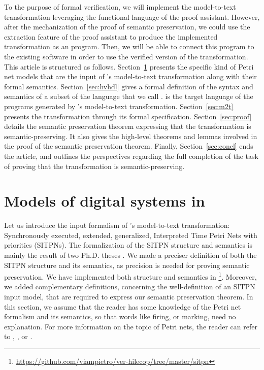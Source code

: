 \documentclass[pdflatex,sn-mathphys]{sn-jnl}%
\theoremstyle{thmstyleone}%
\theoremstyle{thmstyletwo}%
\theoremstyle{thmstylethree}%
\begin{document}
To the purpose of formal verification, we will implement the
\hilecop{} model-to-text transformation leveraging the functional
language of the \coq{} proof assistant. However, after the
mechanization of the proof of semantic preservation, we could use the
extraction feature of the \coq{} proof assistant to produce the
implemented transformation as an \ocaml{} program. Then, we will be
able to connect this program to the existing \hilecop{} software in
order
to use the verified version of the transformation.\\

This article is structured as
follows. Section~\ref{sec:hilecop-models} presents the specific kind
of Petri net models that are the input of \hilecop{}'s model-to-text
transformation along with their formal semantics.
Section~\ref{sec:hvhdl} gives a formal definition of the syntax and
semantics of a subset of the \vhdl{} language that we call
\hvhdl{}. \hvhdl{} is the target language of the programs generated by
\hilecop{}'s model-to-text transformation.  Section~\ref{sec:m2t}
presents the transformation through its formal specification.
Section~\ref{sec:proof} details the semantic preservation theorem
expressing that the \hilecop{} transformation is semantic-preserving.
It also gives the high-level theorems and lemmas involved in the proof
of the semantic preservation theorem.  Finally,
Section~\ref{sec:concl} ends the article, and outlines the
perspectives regarding the full completion of the task of proving that
the \hilecop{} transformation is semantic-preserving.

\section{Models of digital systems in \hilecop{}}
\label{sec:hilecop-models}

Let us introduce the input formalism of \hilecop{}'s model-to-text
transformation: Synchronously executed, extended, generalized,
Interpreted Time Petri Nets with priorities (SITPNs). The
formalization of the SITPN structure and semantics is mainly the
result of two Ph.D. theses \cite{Leroux2014,Merzoug2018}. We made a
preciser definition of both the SITPN structure and its semantics, as
precision is needed for proving semantic preservation. We have
implemented both structure and semantics in
\coq{}\footnote{\url{https://github.com/viampietro/ver-hilecop/tree/master/sitpn}}. Moreover,
we added complementary definitions, concerning the well-definition of
an SITPN input model, that are required to express our semantic
preservation theorem. In this section, we assume that the reader has
some knowledge of the Petri net formalism and its semantics, so that
words like firing, or marking, need no explanation. For more
information on the topic of Petri nets, the reader can refer to
\cite{David1994}, \cite{Murata1989}, or \cite{Diaz2001}.
\end{document}
